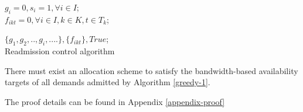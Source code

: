 \documentclass[sigconf]{acmart}
\begin{document}
 \begin{algorithm}
$g_i=0, s_i=1, \forall i \in I$; \\
$f_{ikt} = 0, \forall i \in I ,  k\in K,   t\in T_{k}$;\\

\Return $\{g_1, g_2,..,g_i,....\},\{f_{ikt}\}, True$;\\
\caption{Readmission control algorithm}
\label{greedy-1}
\end{algorithm}


\begin{lemma}\label{NP-222}
There must exist an allocation scheme to satisfy the bandwidth-based availability targets of all demands admitted by Algorithm \ref{greedy-1}.
\end{lemma} 
The proof details can be found in Appendix \ref{appendix-proof}
\end{document}

